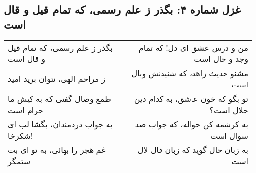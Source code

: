 \begin{center}
\section*{غزل شماره ۴: بگذر ز علم رسمی، که تمام قیل و قال است}
\label{sec:004}
\begin{longtable}{l p{0.5cm} r}
بگذر ز علم رسمی، که تمام قیل و قال است
&&
من و درس عشق ای دل! که تمام وجد و حال است
\\
ز مراحم الهی، نتوان برید امید
&&
مشنو حدیث زاهد، که شنیدنش وبال است
\\
طمع وصال گفتی که به کیش ما حرام است
&&
تو بگو که خون عاشق، به کدام دین حلال است؟
\\
به جواب دردمندان، بگشا لب ای شکرخا!
&&
به کرشمه کن حواله، که جواب صد سوال است
\\
غم هجر را بهائی، به تو ای بت ستمگر
&&
به زبان حال گوید که زبان قال لال است
\\
\end{longtable}
\end{center}
